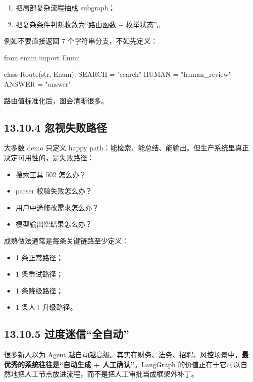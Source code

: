 \begin{enumerate}[leftmargin=2em]
\item 把局部复杂流程抽成 subgraph；
\item 把复杂条件判断收敛为``路由函数 + 枚举状态''。
\end{enumerate}

例如不要直接返回 7 个字符串分支，不如先定义：


\begin{codeblock}
from enum import Enum

class Route(str, Enum):
    SEARCH = "search"
    HUMAN = "human_review"
    ANSWER = "answer"
\end{codeblock}

路由值标准化后，图会清晰很多。


\subsection{13.10.4 忽视失败路径}

大多数 demo 只定义 happy path：能检索、能总结、能输出。但生产系统里真正决定可用性的，是失败路径：


\begin{itemize}[leftmargin=2em]
\item 搜索工具 502 怎么办？
\item parser 校验失败怎么办？
\item 用户中途修改需求怎么办？
\item 模型输出空结果怎么办？
\end{itemize}

成熟做法通常是每条关键链路至少定义：


\begin{itemize}[leftmargin=2em]
\item 1 条正常路径；
\item 1 条重试路径；
\item 1 条降级路径；
\item 1 条人工升级路径。
\end{itemize}

\subsection{13.10.5 过度迷信``全自动''}

很多新人以为 Agent 越自动越高级。其实在财务、法务、招聘、风控场景中，\textbf{最优秀的系统往往是``自动生成 + 人工确认''}。LangGraph 的价值正在于它可以自然地把人工节点放进流程，而不是把人工审批当成框架外补丁。


